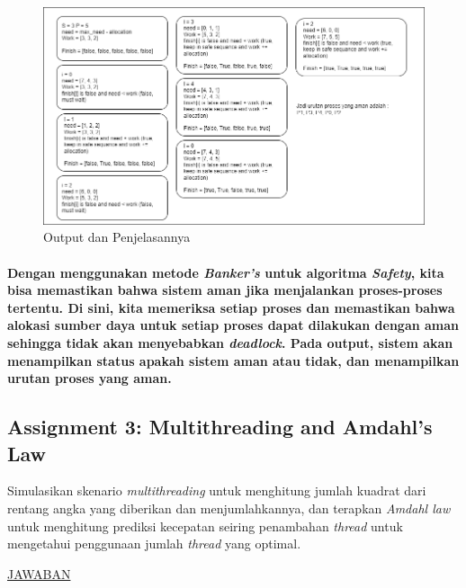 \documentclass[12pt]{article}
\begin{document}
\begin{figure}[H]
    \centering
    \includegraphics[width=1\linewidth]{asset/421.png}
    \caption{Output dan Penjelasannya}
\end{figure}

\paragraph{
    \hspace*{1cm} Dengan menggunakan metode \textit{Banker's} untuk algoritma \textit{Safety}, kita bisa memastikan bahwa sistem aman jika menjalankan proses-proses tertentu. Di sini, kita memeriksa setiap proses dan memastikan bahwa alokasi sumber daya untuk setiap proses dapat dilakukan dengan aman sehingga tidak akan menyebabkan \textit{deadlock}. Pada output, sistem akan menampilkan status apakah sistem aman atau tidak, dan menampilkan urutan proses yang aman.
}


\subsection{Assignment 3: Multithreading and Amdahl's Law}
\hspace*{1cm} Simulasikan skenario \textit{multithreading} untuk menghitung jumlah kuadrat dari rentang angka yang diberikan dan menjumlahkannya, dan terapkan \textit{Amdahl law} untuk menghitung prediksi kecepatan seiring penambahan \textit{thread} untuk mengetahui penggunaan jumlah \textit{thread} yang optimal.
\newline
\newline

\begin{center}
    \underline{JAWABAN}
\end{center}
\end{document}
